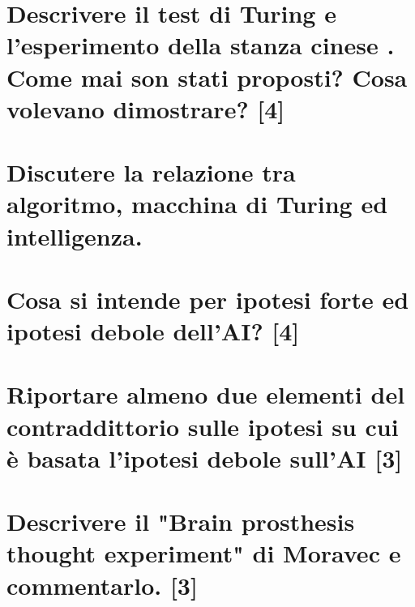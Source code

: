 \documentclass[\main/main.tex]{subfiles}
\begin{document}
\section{Descrivere il test di Turing e l'esperimento della stanza cinese . Come mai son stati proposti? Cosa volevano dimostrare? [4]}
\section{Discutere la relazione tra algoritmo, macchina di Turing ed intelligenza.}
\section{Cosa si intende per ipotesi forte ed ipotesi debole dell'AI? [4]}
\section{Riportare almeno due elementi del contraddittorio sulle ipotesi su cui è basata l'ipotesi debole sull'AI [3]}
\section{Descrivere il "Brain prosthesis thought experiment" di Moravec e commentarlo. [3]}
\end{document}
